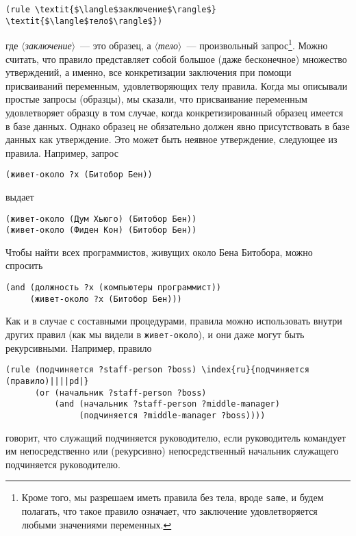 \begin{Verbatim}[fontsize=\small]
(rule \textit{$\langle$заключение$\rangle$} \textit{$\langle$тело$\rangle$})
\end{Verbatim}
где \textit{$\langle$заключение$\rangle$}~--- это образец, а
\textit{$\langle$тело$\rangle$}~--- произвольный 
запрос\footnote{Кроме того, мы разрешаем иметь правила без тела,
вроде {\tt same}, и будем полагать, что такое правило означает,
что заключение удовлетворяется любыми значениями переменных.}.
Можно
считать, что правило представляет собой большое (даже бесконечное)
множество утверждений, а именно, все конкретизации заключения при
помощи присваиваний переменным, удовлетворяющих телу правила.
Когда мы описывали простые запросы (образцы), мы сказали, что
присваивание переменным удовлетворяет образцу в том случае, когда
конкретизированный образец имеется в базе данных.  Однако образец не
обязательно должен явно присутствовать в базе данных как утверждение.
Это может быть неявное утверждение, 
следующее из правила.  Например, запрос

\begin{Verbatim}[fontsize=\small]
(живет-около ?x (Битобор Бен))
\end{Verbatim}
выдает

\begin{Verbatim}[fontsize=\small]
(живет-около (Дум Хьюго) (Битобор Бен))
(живет-около (Фиден Кон) (Битобор Бен))
\end{Verbatim}
Чтобы найти всех программистов, живущих около Бена Битобора,
можно спросить

\begin{Verbatim}[fontsize=\small]
(and (должность ?x (компьютеры программист))
     (живет-около ?x (Битобор Бен)))
\end{Verbatim}

Как и в случае с составными 
процедурами, правила
можно использовать внутри других правил (как мы видели в
{\tt живет-около}),  и они даже могут быть рекурсивными.  Например,
правило

\begin{Verbatim}[fontsize=\small]
(rule (подчиняется ?staff-person ?boss) \index{ru}{подчиняется (правило)||||pd|}
      (or (начальник ?staff-person ?boss)
          (and (начальник ?staff-person ?middle-manager)
               (подчиняется ?middle-manager ?boss))))
\end{Verbatim}
говорит, что служащий подчиняется руководителю, если руководитель командует
им непосредственно или (рекурсивно) непосредственный начальник
служащего подчиняется руководителю.


